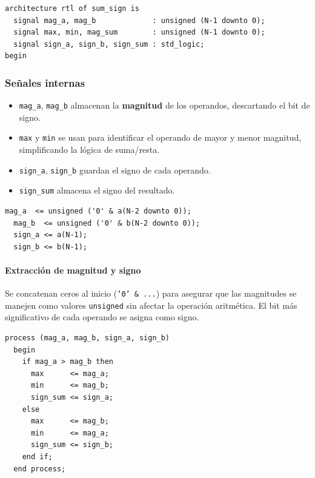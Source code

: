 \documentclass[a4paper,12pt]{article}
\begin{document}
\begin{lstlisting}[caption={Definicion de Senales}, label={lst:sum_sign}]
architecture rtl of sum_sign is
  signal mag_a, mag_b             : unsigned (N-1 downto 0);
  signal max, min, mag_sum        : unsigned (N-1 downto 0);
  signal sign_a, sign_b, sign_sum : std_logic;
begin
\end{lstlisting}

\subsubsection*{Señales internas}
\begin{itemize}
    \item \texttt{mag\_a}, \texttt{mag\_b} almacenan la \textbf{magnitud} de los operandos, descartando el bit de signo.
    \item \texttt{max} y \texttt{min} se usan para identificar el operando de mayor y menor magnitud, simplificando la lógica de suma/resta.
    \item \texttt{sign\_a}, \texttt{sign\_b} guardan el signo de cada operando.
    \item \texttt{sign\_sum} almacena el signo del resultado.
\end{itemize}

\begin{lstlisting}[caption={Extraccion de magnitud y signo}, label={lst:sum_sign}]
  mag_a  <= unsigned ('0' & a(N-2 downto 0)); 
  mag_b  <= unsigned ('0' & b(N-2 downto 0)); 
  sign_a <= a(N-1); 
  sign_b <= b(N-1); 
\end{lstlisting}

\paragraph{Extracción de magnitud y signo}
Se concatenan ceros al inicio (\texttt{'0' \& ...}) para asegurar que las magnitudes se manejen como valores \texttt{unsigned} sin afectar la operación aritmética.  
El bit más significativo de cada operando se asigna como signo.

\begin{lstlisting}[caption={Logica comibacional}, label={lst:sum_sign}]
  process (mag_a, mag_b, sign_a, sign_b)
  begin
    if mag_a > mag_b then
      max      <= mag_a;
      min      <= mag_b;
      sign_sum <= sign_a; 
    else
      max      <= mag_b;
      min      <= mag_a;
      sign_sum <= sign_b; 
    end if;
  end process;
\end{lstlisting}
\end{document}
